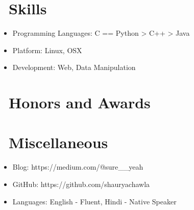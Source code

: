 \documentclass{resume}
\begin{document}

\section{\faCogs\ Skills}
\begin{itemize}[parsep=0.5ex]
  \item Programming Languages: C == Python > C++ > Java
  \item Platform: Linux, OSX
  \item Development: Web, Data Manipulation
\end{itemize}

\section{\faHeartO\ Honors and Awards}

\section{\faInfo\ Miscellaneous}
\begin{itemize}[parsep=0.5ex]
  \item Blog: https://medium.com/@sure__yeah
  \item GitHub: https://github.com/shauryachawla
  \item Languages: English - Fluent, Hindi - Native Speaker
\end{itemize}

%
%
\end{document}
